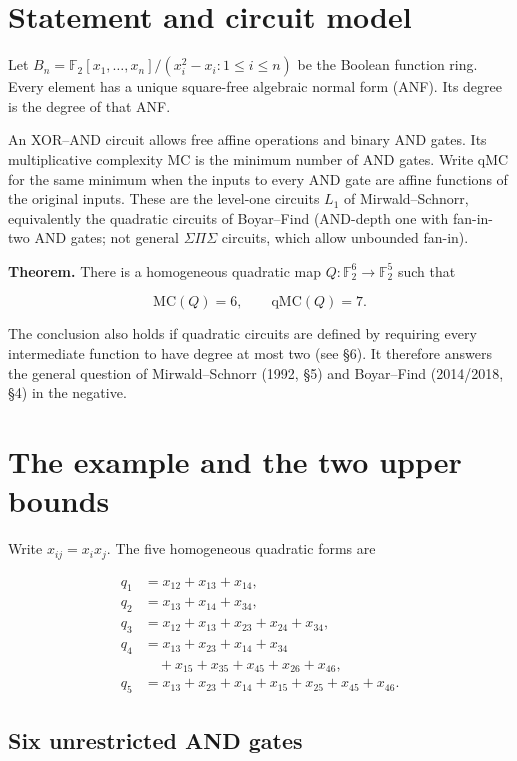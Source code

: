 \section{Statement and circuit model}

Let $B_n=\mathbb F_2[x_1,\ldots,x_n]/(x_i^2-x_i:1\le i\le n)$ be the Boolean function ring. Every element has a unique square-free algebraic normal form (ANF). Its degree is the degree of that ANF.

An XOR--AND circuit allows free affine operations and binary AND gates. Its multiplicative complexity $\mathrm{MC}$ is the minimum number of AND gates. Write $\mathrm{qMC}$ for the same minimum when the inputs to every AND gate are affine functions of the original inputs. These are the level-one circuits $L_1$ of Mirwald--Schnorr, equivalently the quadratic circuits of Boyar--Find (AND-depth one with fan-in-two AND gates; not general $\Sigma\Pi\Sigma$ circuits, which allow unbounded fan-in).

\textbf{Theorem.} There is a homogeneous quadratic map $Q:\mathbb F_2^6\to\mathbb F_2^5$ such that

\[\mathrm{MC}(Q)=6,\qquad \mathrm{qMC}(Q)=7.\]

The conclusion also holds if quadratic circuits are defined by requiring every intermediate function to have degree at most two (see \S{}6). It therefore answers the general question of Mirwald--Schnorr (1992, \S{}5) and Boyar--Find (2014/2018, \S{}4) in the negative.

\section{The example and the two upper bounds}

Write $x_{ij}=x_ix_j$. The five homogeneous quadratic forms are

\[\begin{aligned}
q_1&=x_{12}+x_{13}+x_{14},\\
q_2&=x_{13}+x_{14}+x_{34},\\
q_3&=x_{12}+x_{13}+x_{23}+x_{24}+x_{34},\\
q_4&=x_{13}+x_{23}+x_{14}+x_{34}\\
   &\quad+x_{15}+x_{35}+x_{45}+x_{26}+x_{46},\\
q_5&=x_{13}+x_{23}+x_{14}+x_{15}+x_{25}+x_{45}+x_{46}.
\end{aligned}\]

\subsection*{Six unrestricted AND gates}


